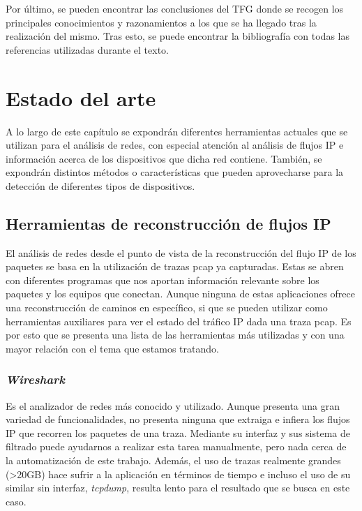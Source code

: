\documentclass[tfg,epsbased,lof,lot,loa,final,nocopyright,overleaf]{tfgtfmthesisuam}
\begin{document}
Por último, se pueden encontrar las conclusiones del TFG donde se recogen los principales conocimientos y razonamientos a los que se ha llegado tras la realización del mismo. Tras esto, se puede encontrar la bibliografía con todas las referencias utilizadas durante el texto.

\chapter{Estado del arte}
A lo largo de este capítulo se expondrán diferentes herramientas actuales que se utilizan para el análisis de redes, con especial atención al análisis de flujos IP e información acerca de los dispositivos que dicha red contiene. También, se expondrán distintos métodos o características que pueden aprovecharse para la detección de diferentes tipos de dispositivos.

\section{Herramientas de reconstrucción de flujos IP}
El análisis de redes desde el punto de vista de la reconstrucción del flujo IP de los paquetes se basa en la utilización de trazas pcap ya capturadas. Estas se abren con diferentes programas que nos aportan información relevante sobre los paquetes y los equipos que conectan. Aunque ninguna de estas aplicaciones ofrece una reconstrucción de caminos en específico, si que se pueden utilizar como herramientas auxiliares para ver el estado del tráfico IP dada una traza pcap. Es por esto que se presenta una lista de las herramientas más utilizadas \cite{Gandhi2014} y con una mayor relación con el tema que estamos tratando.

\subsection{\textit{Wireshark}}
Es el analizador de redes más conocido y utilizado. Aunque presenta una gran variedad de funcionalidades, no presenta ninguna que extraiga e infiera los flujos IP que recorren los paquetes de una traza. Mediante su interfaz y sus sistema de filtrado puede ayudarnos a realizar esta tarea manualmente, pero nada cerca de la automatización de este trabajo. Además, el uso de trazas realmente grandes (>20GB) hace sufrir a la aplicación en términos de tiempo e incluso el uso de su similar sin interfaz, \textit{tcpdump}, resulta lento para el resultado que se busca en este caso.
\end{document}
